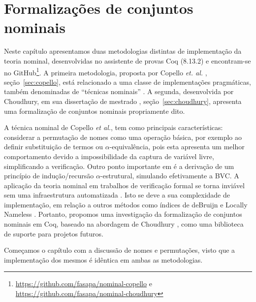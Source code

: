 \chapter{Formalizações de conjuntos nominais}\label{chp:formalizacao}

Neste capítulo apresentamos duas metodologias distintas de implementação da teoria nominal, desenvolvidas no assistente de provas Coq (8.13.2) e encontram-se no GitHub\footnote{\url{https://github.com/fasapa/nominal-copello} e \url{https://github.com/fasapa/nominal-choudhury}}. A primeira metodologia, proposta por Copello \textit{et. al.} \cite{Copello2016}, seção~\ref{sec:copello}, está relacionado a uma classe de implementações pragmáticas, também denominadas de ``técnicas nominais'' \cite{Aydemir2007,Copello2016,Tasistro2015,Copello2018,Ambal2020}. A segunda, desenvolvida por Choudhury, em sua dissertação de mestrado \cite{Choudhury2015}, seção~\ref{sec:choudhury}, apresenta uma formalização de conjuntos nominais propriamente dito.

A técnica nominal de Copello \textit{et al.}, tem como principais características: considerar a permutação de nomes como uma operação básica, por exemplo ao definir substituição de termos ou $\alpha$-equivalência, pois esta apresenta um melhor comportamento devido a impossibilidade da captura de variável livre, simplificando a verificação. Outro ponto importante em \cite{Copello2016} é a derivação de um princípio de indução/recursão $\alpha$-estrutural, simulando efetivamente a BVC.
A aplicação da teoria nominal em trabalhos de verificação formal se torna inviável sem uma infraestrutura automatizada \cite{Aydemir2008}. Isto se deve a sua complexidade de implementação, em relação a outros métodos como índices de deBruijn \cite{Bruijn1972} e Locally Nameless \cite{Chargueraud2011}.
Portanto, propomos uma investigação da formalização de conjuntos nominais em Coq, baseado na abordagem de Choudhury \cite{Choudhury2015}, como uma biblioteca de suporte para projetos futuros.

Começamos o capítulo com a discussão de nomes e permutações, visto que a implementação dos mesmos é idêntica em ambas as metodologias.

